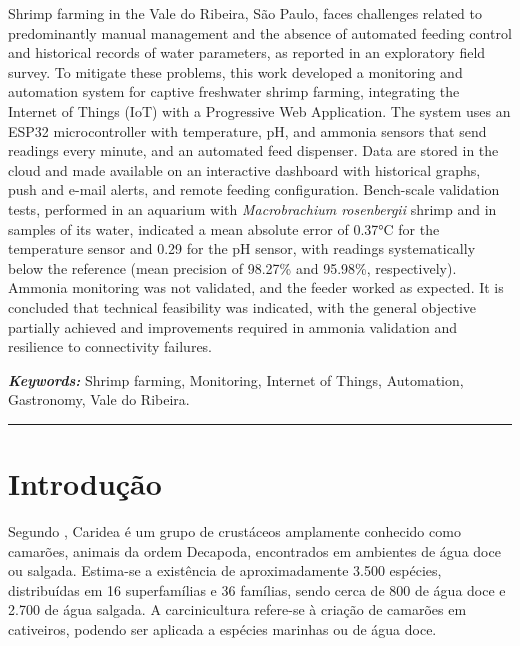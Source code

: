 \documentclass[11pt,a4paper]{article}
\begin{document}
Shrimp farming in the Vale do Ribeira, São Paulo, faces challenges related to predominantly manual management and the absence of automated feeding control and historical records of water parameters, as reported in an exploratory field survey. To mitigate these problems, this work developed a monitoring and automation system for captive freshwater shrimp farming, integrating the Internet of Things (IoT) with a Progressive Web Application. The system uses an ESP32 microcontroller with temperature, pH, and ammonia sensors that send readings every minute, and an automated feed dispenser. Data are stored in the cloud and made available on an interactive dashboard with historical graphs, push and e-mail alerts, and remote feeding configuration. Bench-scale validation tests, performed in an aquarium with \textit{Macrobrachium rosenbergii} shrimp and in samples of its water, indicated a mean absolute error of 0.37°C for the temperature sensor and 0.29 for the pH sensor, with readings systematically below the reference (mean precision of 98.27\% and 95.98\%, respectively). Ammonia monitoring was not validated, and the feeder worked as expected. It is concluded that technical feasibility was indicated, with the general objective partially achieved and improvements required in ammonia validation and resilience to connectivity failures.

\vspace{0.3cm}
\noindent\textit{\textbf{Keywords:}} Shrimp farming, Monitoring, Internet of Things, Automation, Gastronomy, Vale do Ribeira.

\vspace{0.5cm}
\noindent\rule{\textwidth}{0.5pt}
\vspace{0.5cm}

\section{Introdução}

Segundo \cite{bertini2021}, Caridea é um grupo de crustáceos amplamente conhecido como camarões, animais da ordem Decapoda, encontrados em ambientes de água doce ou salgada. Estima-se a existência de aproximadamente 3.500 espécies, distribuídas em 16 superfamílias e 36 famílias, sendo cerca de 800 de água doce e 2.700 de água salgada. A carcinicultura refere-se à criação de camarões em cativeiros, podendo ser aplicada a espécies marinhas ou de água doce.
\end{document}
